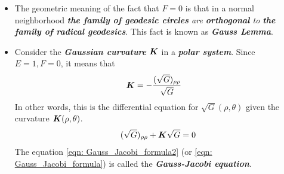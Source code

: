 \documentclass[11pt]{article}
\begin{document}
\begin{itemize}
\begin{proof}
To show the last assertion, we choose a system of normal coordinate $(\bar{u}, \bar{v})$ in $p$ such that the change of coordinate is given as 
\begin{align*}
\bar{u} = \rho\cos\theta; && \bar{v} = \rho\sin\theta, && \rho\neq 0, \; 0< \theta<2\pi.
\end{align*}
By recalling that 
\begin{align*}
\sqrt{EG- F^{2}} &= \sqrt{\bar{E}\bar{G} - \bar{F}^{2}}\;\frac{\partial (\bar{u}, \bar{v})}{\partial (\rho,\theta)}
\end{align*}
where $\frac{\partial (\bar{u}, \bar{v})}{\partial (\rho,\theta)} = \rho$ is the Jacobian of the change of the coordinates and $\bar{E},\bar{G}, \bar{F}$ are coefficients of the first fundamental form in $(\bar{u}, \bar{v})$, we have
\begin{align*}
\sqrt{G} &= \rho \sqrt{\bar{E}\bar{G} - \bar{F}^{2}}, \quad \rho \neq 0.
\end{align*}
Since at $p$, $\bar{E}=\bar{G}=1, \bar{F}=0$ (as it is the orthonormal coordinates in $p$), we conclude that 
\begin{align*}
\lim_{\rho \rightarrow 0}\sqrt{G} =0 && \lim_{\rho \rightarrow 0}(\sqrt{G})_{\rho} = 1,
\end{align*} 
which concludes the proof of the proposition.\QEDA
\end{proof}

\item The geometric meaning of the fact that $F=0$  is that in a normal neighborhood \emph{\textbf{the family of geodesic circles} are \textbf{orthogonal} to \textbf{the family of radical geodesics}}. This fact is known as \emph{\textbf{Gauss Lemma}}. 

\item Consider the \textbf{\emph{Gaussian curvature}} $\boldsymbol{K}$ in a \textbf{\emph{polar system}}. Since $E=1,F=0$, it means that 
\begin{align}
\boldsymbol{K} &= -\frac{(\sqrt{G})_{\rho\rho}}{\sqrt{G}} \label{eqn: Gauss_Jacobi_formula}
\end{align}
In other words, this is the differential equation for $\sqrt{G}(\rho, \theta)$ given the curvature $\boldsymbol{K}(\rho, \theta)$.  
\begin{align}
(\sqrt{G})_{\rho\rho} + \boldsymbol{K}\sqrt{G} = 0 \label{eqn: Gauss_Jacobi_formula2}
\end{align} The equation \eqref{eqn: Gauss_Jacobi_formula2} (or \eqref{eqn: Gauss_Jacobi_formula}) is called the \emph{\textbf{Gauss-Jacobi equation}}. 


\end{itemize}
\end{document}
